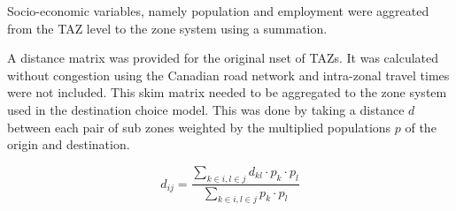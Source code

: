 Socio-economic variables, namely population and employment were aggreated from the TAZ level to the zone system using a summation.

A distance matrix was provided for the original nset of TAZs. It was calculated without congestion using the Canadian road network and intra-zonal travel times were not included. This skim matrix needed to be aggregated to the zone system used in the destination choice model. This was done by taking a distance $d$ between each pair of sub zones weighted by the multiplied populations $p$ of the origin and destination.

$$ d_{ij} = 
\frac{
\sum_{k \in i, l \in j} d_{kl} \cdot p_k \cdot p_l}
{
\sum_{k \in i, l \in j} p_k \cdot p_l
} 
$$


